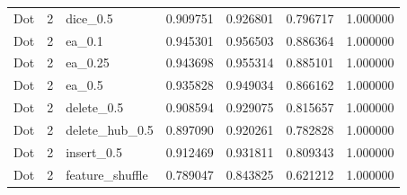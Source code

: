 \documentclass[UTF8,a4paper,11pt,fontset=fandol]{ctexart}
\begin{document}
{\begin{longtable}{lrlrrrr}
Dot & 2 & dice\_0.5 & 0.909751 & 0.926801 & 0.796717 & 1.000000 \\
Dot & 2 & ea\_0.1 & 0.945301 & 0.956503 & 0.886364 & 1.000000 \\
Dot & 2 & ea\_0.25 & 0.943698 & 0.955314 & 0.885101 & 1.000000 \\
Dot & 2 & ea\_0.5 & 0.935828 & 0.949034 & 0.866162 & 1.000000 \\
Dot & 2 & delete\_0.5 & 0.908594 & 0.929075 & 0.815657 & 1.000000 \\
Dot & 2 & delete\_hub\_0.5 & 0.897090 & 0.920261 & 0.782828 & 1.000000 \\
Dot & 2 & insert\_0.5 & 0.912469 & 0.931811 & 0.809343 & 1.000000 \\
Dot & 2 & feature\_shuffle & 0.789047 & 0.843825 & 0.621212 & 1.000000 \\
\end{longtable}
}
\end{document}

